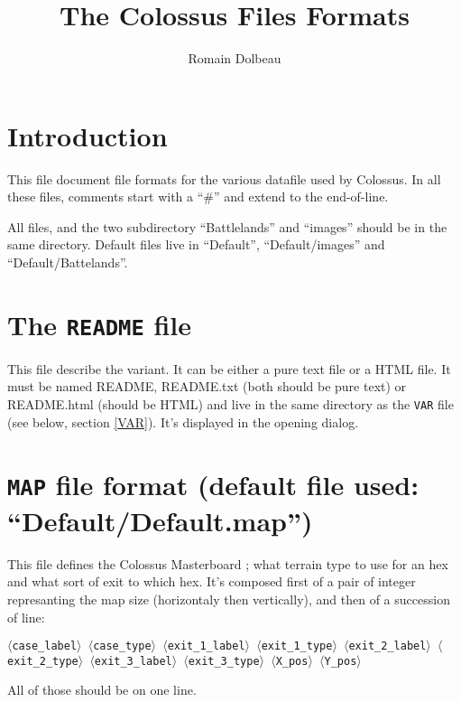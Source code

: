 \documentclass{article}
\begin{document}

\title{The Colossus Files Formats}

\author{Romain Dolbeau}

\maketitle


\section* {Introduction}

This file document file formats for the various datafile used by Colossus. In all these files, comments start with a ``\#'' and extend to the end-of-line.

All files, and the two subdirectory ``Battlelands'' and ``images'' should be in the same directory. Default files live in ``Default'', ``Default/images'' and ``Default/Battelands''.

\section {The \texttt{README} file}

This file describe the variant. It can be either a pure text file or a HTML file. It must be named README, README.txt (both should be pure text) or README.html (should  be HTML) and live in the same directory as the \texttt{VAR} file (see below, section \ref{VAR}). It's displayed in the opening dialog.

\section {\texttt{MAP} file format (default file used: ``Default/Default.map'')}

This file defines the Colossus Masterboard ; what terrain type to use for an hex and what sort of exit to which hex. It's composed first of a pair of integer represanting the map size (horizontaly then vertically), and then of a succession of line:

\texttt{$\langle$case\_label$\rangle$ $\langle$case\_type$\rangle$
 $\langle$exit\_1\_label$\rangle$ $\langle$exit\_1\_type$\rangle$
 $\langle$exit\_2\_label$\rangle$ $\langle$exit\_2\_type$\rangle$
 $\langle$exit\_3\_label$\rangle$ $\langle$exit\_3\_type$\rangle$
 $\langle$X\_pos$\rangle$ $\langle$Y\_pos$\rangle$}

All of those should be on one line.
\end{document}
